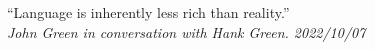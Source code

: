\documentclass[convert=imagemagick]{standalone}
\begin{document}
\parbox[t][36pt][c]{300pt}{
``Language is inherently less rich than reality.''\\
\textit{John Green in conversation with Hank Green. 2022/10/07}
}
\end{document}

